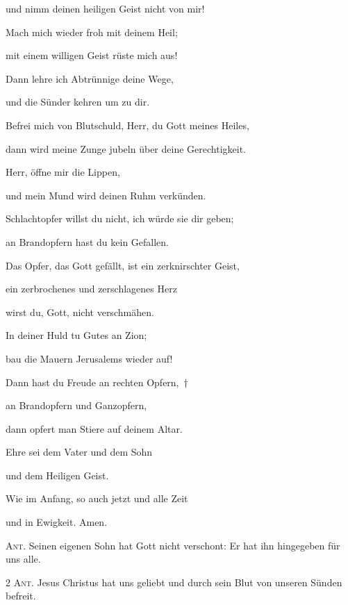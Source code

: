 und nimm deinen heiligen Geist nicht von mir!

\noindent Mach mich wieder froh mit deinem Heil;~\GreStar{}~\nopagebreak

mit einem willigen Geist rüste mich aus!

\noindent Dann lehre ich Abtrünnige deine Wege,~\GreStar{}~\nopagebreak

und die Sünder kehren um zu dir.

\noindent Befrei mich von Blutschuld, Herr, du Gott meines Heiles,~\GreStar{}~\nopagebreak

dann wird meine Zunge jubeln über deine Gerechtigkeit.

\noindent Herr, öffne mir die Lippen,~\GreStar{}~\nopagebreak

und mein Mund wird deinen Ruhm verkünden.

\noindent Schlachtopfer willst du nicht, ich würde sie dir geben;~\GreStar{}~\nopagebreak

an Brandopfern hast du kein Gefallen.

\noindent Das Opfer, das Gott gefällt, ist ein zerknirschter Geist,~\GreStar{}~\nopagebreak

ein zerbrochenes und zerschlagenes Herz 

wirst du, Gott, nicht verschmähen.

\noindent In deiner Huld tu Gutes an Zion;~\GreStar{}~\nopagebreak

bau die Mauern Jerusalems wieder auf!

\noindent Dann hast du Freude an rechten Opfern,~†~\nopagebreak

an Brandopfern und Ganzopfern,~\GreStar{}~\nopagebreak

dann opfert man Stiere auf deinem Altar.

\noindent Ehre sei dem Vater und dem Sohn~\GreStar{}~\nopagebreak

und dem Heiligen Geist.

\noindent Wie im Anfang, so auch jetzt und alle Zeit~\GreStar{}~\nopagebreak

und in Ewigkeit. Amen.

\vspace{10pt}

\noindent \textsc{Ant.} Seinen eigenen Sohn hat Gott nicht verschont: Er hat ihn hingegeben für uns alle.

\vspace{10pt}

\noindent \textsc{2 Ant.} Jesus Christus hat uns geliebt und durch sein Blut von unseren Sünden befreit. \nopagebreak


